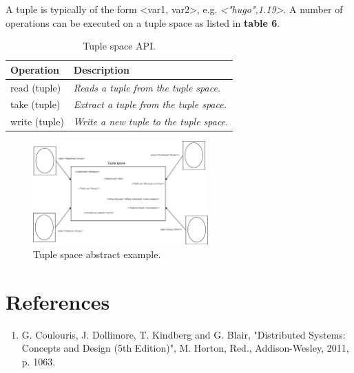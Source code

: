 A tuple is typically of the form <var1, var2>, e.g. \emph{<"hugo",1.19>}. A number of operations can be executed on a tuple space as listed in \textbf{table 6}.


\begin{table}
	\caption{Tuple space API.}
	\label{tab:api:tuplespaces}
	\begin{tabular}{p{150px} | p{250px}}
		\textbf{Operation} & \textbf{Description} \\
		\hline
		read (tuple) 	& \emph{Reads a tuple from the tuple space.} \\
		take (tuple) 	& \emph{Extract a tuple from the tuple space.} \\
		write (tuple) & \emph{Write a new tuple to the tuple space.} \\
		\hline
	\end{tabular}
\end{table}


\begin{figure}
	\begin{center}
		\includegraphics[width=0.6\textwidth]{img/tuplespace}
	\end{center}
	\caption{Tuple space abstract example.}
	\label{fig:tuplespace}
\end{figure}




\section*{References}

\begin{enumerate}[1]
	\item G. Coulouris, J. Dollimore, T. Kindberg and G. Blair, "Distributed Systems: Concepts and Design (5th Edition)", M. Horton, Red., Addison-Wesley, 2011, p. 1063.
\end{enumerate}